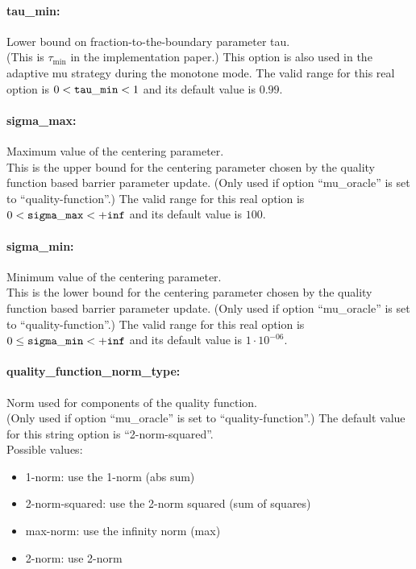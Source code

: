 \paragraph{tau\_min:} Lower bound on fraction-to-the-boundary parameter tau. $\;$ \\
 (This is $\tau_{\min}$ in the implementation paper.)  This
option is also used in the adaptive mu strategy
during the monotone mode. The valid range for this real option is 
$0 <  {\tt tau\_min } <  1$
and its default value is $0.99$.


\paragraph{sigma\_max:} Maximum value of the centering parameter. $\;$ \\
 This is the upper bound for the centering
parameter chosen by the quality function based
barrier parameter update. (Only used if option
``mu\_oracle'' is set to ``quality-function''.) The valid range for this real option is 
$0 <  {\tt sigma\_max } <  {\tt +inf}$
and its default value is $100$.


\paragraph{sigma\_min:} Minimum value of the centering parameter. $\;$ \\
 This is the lower bound for the centering
parameter chosen by the quality function based
barrier parameter update. (Only used if option
``mu\_oracle'' is set to ``quality-function''.) The valid range for this real option is 
$0 \le {\tt sigma\_min } <  {\tt +inf}$
and its default value is $1 \cdot 10^{-06}$.


\paragraph{quality\_function\_norm\_type:} Norm used for components of the quality function. $\;$ \\
 (Only used if option ``mu\_oracle'' is set to
``quality-function''.)
The default value for this string option is ``2-norm-squared''.
\\ 
Possible values:
\begin{itemize}
   \item 1-norm: use the 1-norm (abs sum)
   \item 2-norm-squared: use the 2-norm squared (sum of squares)
   \item max-norm: use the infinity norm (max)
   \item 2-norm: use 2-norm
\end{itemize}

